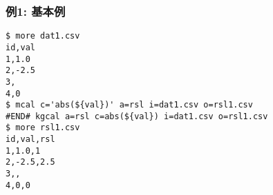 \subsubsection*{例1: 基本例}



\begin{Verbatim}[baselinestretch=0.7,frame=single]
$ more dat1.csv
id,val
1,1.0
2,-2.5
3,
4,0
$ mcal c='abs(${val})' a=rsl i=dat1.csv o=rsl1.csv
#END# kgcal a=rsl c=abs(${val}) i=dat1.csv o=rsl1.csv
$ more rsl1.csv
id,val,rsl
1,1.0,1
2,-2.5,2.5
3,,
4,0,0
\end{Verbatim}
